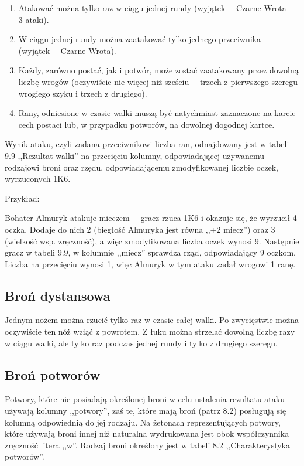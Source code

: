 \begin{enumerate}
    \item
        Atakować można tylko raz w ciągu jednej rundy (wyjątek~-- Czarne Wrota~-- 3 ataki).
    \item
        W ciągu jednej rundy można zaatakować tylko jednego przeciwnika (wyjątek~-- Czarne Wrota).
    \item
        Każdy, zarówno postać, jak i potwór, może zostać zaatakowany przez dowolną liczbę wrogów (oczywiście nie więcej niż sześciu~-- trzech z pierwszego szeregu wrogiego szyku i trzech z drugiego).
    \item
        Rany, odniesione w czasie walki muszą być natychmiast zaznaczone na karcie cech postaci lub, w przypadku potworów, na dowolnej dogodnej kartce.
\end{enumerate}

Wynik ataku, czyli zadana przeciwnikowi liczba ran, odnajdowany jest w tabeli 9.9 ,,Rezultat walki'' na przecięciu kolumny, odpowiadającej używanemu rodzajowi broni oraz rzędu, odpowiadającemu zmodyfikowanej liczbie oczek, wyrzuconych 1K6.

Przykład:

Bohater Almuryk atakuje mieczem~-- gracz rzuca 1K6 i okazuje się, że wyrzucił 4 oczka.
Dodaje do nich 2 (biegłość Almuryka jest równa ,,+2 miecz'') oraz 3 (wielkość wsp. zręczność), a więc zmodyfikowana liczba oczek wynosi 9.
Następnie gracz w tabeli 9.9, w kolumnie ,,miecz'' sprawdza rząd, odpowiadający 9 oczkom.
Liczba na przecięciu wynosi 1, więc Almuryk w tym ataku zadał wrogowi 1 ranę.

\subsection{Broń dystansowa}

Jednym nożem można rzucić tylko raz w czasie całej walki.
Po zwycięstwie można oczywiście ten nóż wziąć z powrotem.
Z łuku można strzelać dowolną liczbę razy w ciągu walki, ale tylko raz podczas jednej rundy i tylko z drugiego szeregu.

\subsection{Broń potworów}

Potwory, które nie posiadają określonej broni w celu ustalenia rezultatu ataku używają kolumny ,,potwory'', zaś te, które mają broń (patrz 8.2) posługują się kolumną odpowiednią do jej rodzaju.
Na żetonach reprezentujących potwory, które używają broni innej niż naturalna wydrukowana jest obok współczynnika zręczność litera ,,w''.
Rodzaj broni określony jest w tabeli 8.2 ,,Charakterystyka potworów''.

